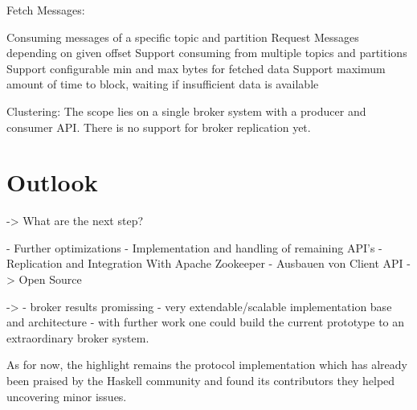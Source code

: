 Fetch Messages: 
\begin{itemize}
        \tick Consuming messages of a specific topic and partition
        \tick Request Messages depending on given offset
        \fail Support consuming from multiple topics and partitions 
        \fail Support configurable min and max bytes for fetched data
        \fail Support maximum amount of time to block, waiting if insufficient
        data is available
\end{itemize}
Clustering: The scope lies on a single broker system with a producer and
consumer API. There is no support for broker replication yet. 


\section{Outlook}
-> What are the next step? 

- Further optimizations 
- Implementation and handling of remaining API's 
- Replication and Integration With Apache Zookeeper 
- Ausbauen von Client API 
-> Open Source 

-> 
- broker results promissing
- very extendable/scalable implementation base and architecture
- with further work one could build the current prototype to an extraordinary
broker system.

As for now, the highlight remains the protocol implementation which has already
been praised by the Haskell community and found its contributors they helped
uncovering minor issues.

